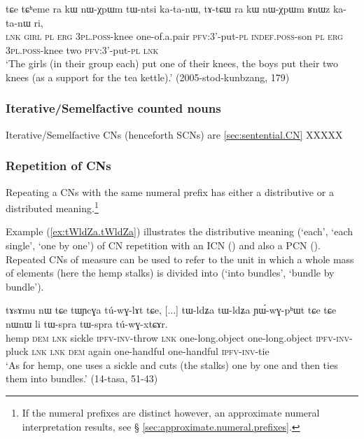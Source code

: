 \begin{exe}
\ex \label{ex:nWXpWm.tWntsi}
\gll tɕe tɕʰeme ra kɯ nɯ-χpɯm tɯ-ntsi ka-ta-nɯ, tɤ-tɕɯ ra kɯ nɯ-χpɯm ʁnɯz ka-ta-nɯ ri,  \\
 \textsc{lnk} \textsc{girl} \textsc{pl} \textsc{erg} \textsc{3pl}.\textsc{poss}-knee one-of.a.pair \textsc{pfv}:3'-put-\textsc{pl} \textsc{indef}.\textsc{poss}-son \textsc{pl} \textsc{erg}  \textsc{3pl}.\textsc{poss}-knee two \textsc{pfv}:3'-put-\textsc{pl} \textsc{lnk} \\
\glt `The girls (in their group each) put one of their knees, the boys put their two knees (as a support for the tea kettle).' (2005-stod-kunbzang, 179)
\end{exe}

\subsubsection{Iterative/Semelfactive counted nouns} \label{sec:CN.iterative}
Iterative/Semelfactive CNs (henceforth SCNs) are %
\ref{sec:sentential.CN} XXXXX

\subsubsection{Repetition of CNs} \label{sec:CN.repetition}
Repeating a CNs with the same numeral prefix has either a distributive or a distributed meaning.\footnote{If the numeral prefixes are distinct however, an approximate numeral interpretation results, see § \ref{sec:approximate.numeral.prefixes}.}

Example (\ref{ex:tWldZa.tWldZa}) illustrates the distributive meaning (`each', `each single', `one by one') of CN repetition with an ICN () and also a PCN  (). Repeated CNs of measure can be used to refer to the unit in which a whole mass of elements (here the hemp stalks) is divided into (`into bundles', `bundle by bundle').

\begin{exe}
\ex \label{ex:tWldZa.tWldZa}
\gll  tɤsɤmu nɯ tɕe tɯɲcɣa tú-wɣ-lɤt tɕe, [...] tɯ-ldʑa tɯ-ldʑa ɲɯ́-wɣ-pʰɯt tɕe tɕe nɯnɯ li tɯ-spra tɯ-spra tú-wɣ-xtɕɤr. \\
hemp \textsc{dem} \textsc{lnk} sickle \textsc{ipfv}-\textsc{inv}-throw \textsc{lnk} { } one-long.object one-long.object \textsc{ipfv}-\textsc{inv}-pluck \textsc{lnk} \textsc{lnk} \textsc{dem} again one-handful one-handful \textsc{ipfv}-\textsc{inv}-tie  \\
\glt `As for hemp, one uses a sickle and cuts (the stalks) one by one and then ties them into bundles.'  (14-tasa, 51-43)
\end{exe}

